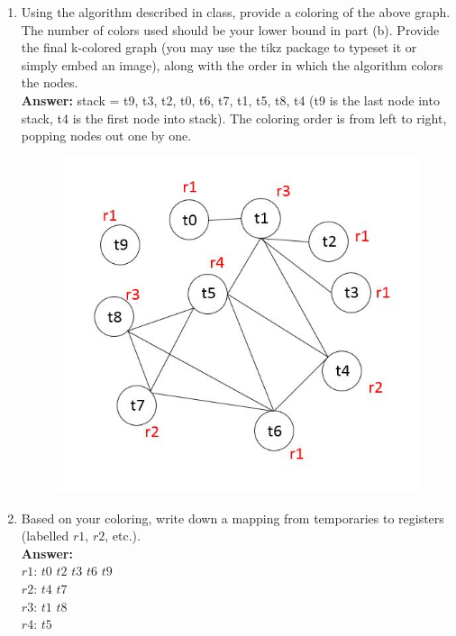 \documentclass[11pt]{article}
\begin{document}
\begin{enumerate}
\begin{enumerate}
   \newpage
    \item Using the algorithm described in class, provide a coloring of the above graph. The number of colors used should be your lower bound in part (b). Provide the final k-colored graph (you may use the tikz package to typeset it or simply embed an image), along with the order in which the algorithm colors the nodes.\\
    \textbf{Answer:} 
    stack = {t9, t3, t2, t0, t6, t7, t1, t5, t8, t4} (t9 is the last node into stack, t4 is the first node into stack). 
	The coloring order is from left to right, popping nodes out one by one. 
       \begin{figure}[h]
    \includegraphics[width=15cm]{3.JPG}
    \end{figure}
    
   \newpage
    \item Based on your coloring, write down a mapping from temporaries to registers (labelled $r1$, $r2$, etc.).\\
    \textbf{Answer:} \\
    {$r1$: $t0$ $t2$ $t3$ $t6$ $t9$}\\
	{$r2$: $t4$ $t7$}\\
	{$r3$: $t1$ $t8$}\\
	{$r4$: $t5$}\\
    
   \newpage
  \end{enumerate}
  
\end{enumerate}
\end{document}
